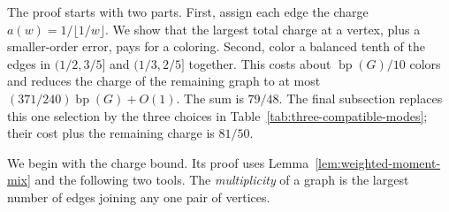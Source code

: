 \documentclass[11pt]{article}
\theoremstyle{definition}\newtheorem{algorithm}{Algorithm}[section]
\numberwithin{equation}{section}
\theoremstyle{remark}\newtheorem*{remark}{Remark}
\newcommand{\bp}{\operatorname{bp}}
\begin{document}
The proof starts with two parts. First, assign each edge the charge
$a(w)=1/\lfloor1/w\rfloor$. We show that the largest total charge at
a vertex, plus a smaller-order error, pays for a coloring. Second,
color a balanced tenth of the edges in $(1/2,3/5]$ and $(1/3,2/5]$
together. This costs about $\bp(G)/10$ colors and reduces the charge
of the remaining graph to at most $(371/240)\bp(G)+O(1)$.
The sum is $79/48$.  The final subsection replaces this one selection
by the three choices in Table~\ref{tab:three-compatible-modes}; their
cost plus the remaining charge is $81/50$.

We begin with the charge bound. Its proof uses
Lemma~\ref{lem:weighted-moment-mix} and the following two tools.
The \emph{multiplicity} of a graph is the largest number of edges
joining any one pair of vertices.
\end{document}
